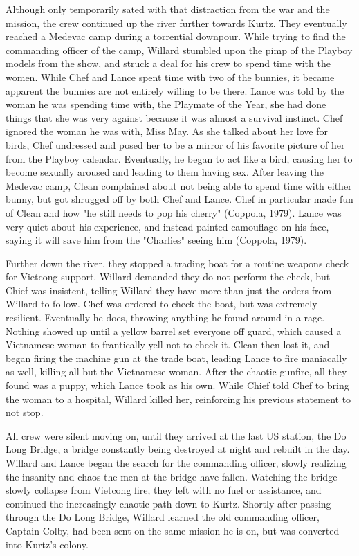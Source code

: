 \documentclass[a4paper,man,natbib]{apa6}
\begin{document}
Although only temporarily sated with that distraction from the war and the mission, the crew continued up the river further towards Kurtz. They eventually reached a Medevac camp during a torrential downpour. While trying to find the commanding officer of the camp, Willard stumbled upon the pimp of the Playboy models from the show, and struck a deal for his crew to spend time with the women. While Chef and Lance spent time with two of the bunnies, it became apparent the bunnies are not entirely willing to be there. Lance was told by the woman he was spending time with, the Playmate of the Year, she had done things that she was very against because it was almost a survival instinct. Chef ignored the woman he was with, Miss May. As she talked about her love for birds, Chef undressed and posed her to be a mirror of his favorite picture of her from the Playboy calendar. Eventually, he began to act like a bird, causing her to become sexually aroused and leading to them having sex. After leaving the Medevac camp, Clean complained about not being able to spend time with either bunny, but got shrugged off by both Chef and Lance. Chef in particular made fun of Clean and how "he still needs to pop his cherry" (Coppola, 1979). Lance was very quiet about his experience, and instead painted camouflage on his face, saying it will save him from the "Charlies" seeing him (Coppola, 1979).

Further down the river, they stopped a trading boat for a routine weapons check for Vietcong support. Willard demanded they do not perform the check, but Chief was insistent, telling Willard they have more than just the orders from Willard to follow. Chef was ordered to check the boat, but was extremely resilient. Eventually he does, throwing anything he found around in a rage. Nothing showed up until a yellow barrel set everyone off guard, which caused a Vietnamese woman to frantically yell not to check it. Clean then lost it, and began firing the machine gun at the trade boat, leading Lance to fire maniacally as well, killing all but the Vietnamese woman. After the chaotic gunfire, all they found was a puppy, which Lance took as his own. While Chief told Chef to bring the woman to a hospital, Willard killed her, reinforcing his previous statement to not stop.

All crew were silent moving on, until they arrived at the last US station, the Do Long Bridge, a bridge constantly being destroyed at night and rebuilt in the day. Willard and Lance began the search for the commanding officer, slowly realizing the insanity and chaos the men at the bridge have fallen. Watching the bridge slowly collapse from Vietcong fire, they left with no fuel or assistance, and continued the increasingly chaotic path down to Kurtz. Shortly after passing through the Do Long Bridge, Willard learned the old commanding officer, Captain Colby, had been sent on the same mission he is on, but was converted into Kurtz's colony.
\end{document}
